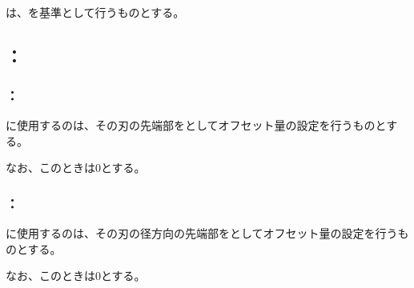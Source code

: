 \subsection{\OutcutMillingReferencePoint}
\OutcutMillingReferencePoint は、\OutcutCenter を基準として行うものとする。


\subsection{\indexTCOutcutMilling\nameToolCorrection：\nameOutcutMilling}


\subsubsection{\indexTLCOutcutMilling\nameTLCorrection：\nameOutcutMilling}
\OutcutMilling に使用する\indexTLSquareEndMill\nameSquareEndMill の\nameToolLength は、その刃の先端部を\nameToolLength としてオフセット量の設定を行うものとする。

なお、このとき\TLCWearValue は0とする。


\subsubsection{\indexTDCOutcutMilling\nameTDCorrection：\nameOutcutMilling}
\OutcutMilling に使用する\indexTDSquareEndMill\nameSquareEndMill の\nameToolDiameter は、その刃の径方向の先端部を\ToolDiameter としてオフセット量の設定を行うものとする。

なお、このとき\TDCWearValue は0とする。



